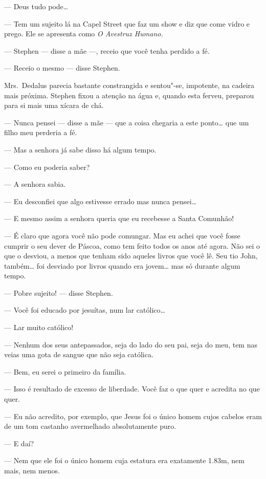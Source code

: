 --- Deus tudo pode\ldots{}

--- Tem um sujeito lá na Capel Street que faz um show e diz que come vidro e
prego.  Ele se apresenta como \textit{O Avestruz Humano.}

--- Stephen --- disse a mãe ---, receio que você tenha perdido a fé.

--- Receio o mesmo --- disse Stephen.

Mrs.~Dedalus parecia bastante constrangida e sentou"-se, impotente, na cadeira
mais próxima.  Stephen fixou a atenção na água e, quando esta ferveu, preparou
para si mais uma xícara de chá.

--- Nunca pensei --- disse a mãe --- que a coisa chegaria a este ponto\ldots{} que
um filho meu perderia a fé.

--- Mas a senhora já sabe disso há algum tempo.

--- Como eu poderia saber?

--- A senhora sabia.

--- Eu desconfiei que algo estivesse errado mas nunca pensei\ldots{}

--- E mesmo assim a senhora queria que eu recebesse a Santa Comunhão!

--- É claro que agora você não pode comungar.  Mas eu achei que você fosse
cumprir o seu dever de Páscoa, como tem feito todos os anos até agora.  Não sei
o que o desviou, a menos que tenham sido aqueles livros que você lê.  Seu tio
John, também\ldots{} foi desviado por livros quando era jovem\ldots{} mas só durante
algum tempo.

--- Pobre sujeito! --- disse Stephen.

--- Você foi educado por jesuítas, num lar católico\ldots{}

--- Lar muito católico!

--- Nenhum dos seus antepassados, seja do lado do seu pai, seja do meu, tem nas
veias uma gota de sangue que não seja católica.

--- Bem, eu serei o primeiro da família.

--- Isso é resultado de excesso de liberdade.  Você faz o que quer e acredita
no que quer.

--- Eu não acredito, por exemplo, que Jesus foi o único homem cujos cabelos
eram de um tom castanho avermelhado absolutamente puro.

--- E daí?

--- Nem que ele foi o único homem cuja estatura era exatamente 1.83m, nem mais,
nem menos.

